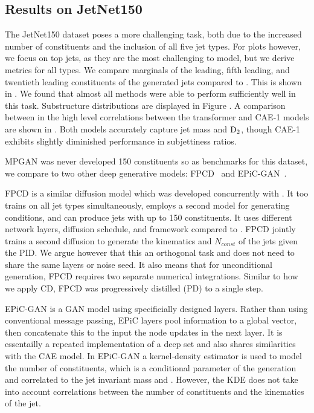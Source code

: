 \FloatBarrier

\subsection{Results on JetNet150}

The JetNet150 dataset poses a more challenging task, both due to the increased number of constituents and the inclusion of all five jet types.
For plots however, we focus on top jets, as they are the most challenging to model, but we derive metrics for all types.
We compare marginals of the leading, fifth leading, and twentieth leading constituents of the generated jets compared to \pythia.
This is shown in .
We found that almost all methods were able to perform sufficiently well in this task.
Substructure distributions are displayed in Figure .
A comparison between in the high level correlations between the transformer and CAE-1 models are shown in .
Both models accurately capture jet mass and $\text{D}_2$, though CAE-1 exhibits slightly diminished performance in subjettiness ratios.

MPGAN was never developed 150 constituents so as benchmarks for this dataset, we compare to two other deep generative models: FPCD~\cite{FPCD} and EPiC-GAN~\cite{EPICGAN}.

FPCD is a similar diffusion model which was developed concurrently with \pcdroid.
It too trains on all jet types simultaneously, employs a second model for generating conditions, and can produce jets with up to 150 constituents. It uses different network layers, diffusion schedule, and framework compared to \pcdroid.
FPCD jointly trains a second diffusion to generate the kinematics and $N_{const}$ of the jets given the PID.
We argue however that this an orthogonal task and does not need to share the same layers or noise seed.
It also means that for unconditional generation, FPCD requires two separate numerical integrations.
Similar to how we apply CD, FPCD was progressively distilled (PD) to a single step.

EPiC-GAN is a GAN model using specificially designed layers.
Rather than using conventional message passing, EPiC layers pool information to a global vector, then concatenate this to the input the node updates in the next layer.
It is essentailly a repeated implementation of a deep set and also shares similarities with the CAE model.
In EPiC-GAN a kernel-density estimator is used to model the number of constituents, which is a conditional parameter of the generation and correlated to the jet invariant mass and \pt.
However, the KDE does not take into account correlations between the number of constituents and the kinematics of the jet.

